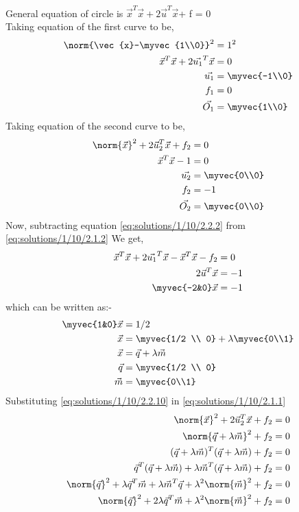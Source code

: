 
General equation of circle is ${\vec{x}^T\vec{x}} + 2\vec{u}^T\vec{x} $+ f = 0\\
Taking equation of the first curve to be,
\begin{align}
\norm{\vec{x}-\myvec{1\\0}}^2&=1^2\\
{\vec{x}^{T}\vec{x}+2\vec{u_1}^T\vec{x}}&=0 \label{eq:solutions/1/10/2.2.2}\\
\vec{u_1}&=\myvec{-1\\0}\\
f_1&=0\\
\vec{O_1}&=\myvec{1\\0}
\end{align}
Taking equation of the second curve to be,
\begin{align}
\norm{\vec{x}}^2 + 2\vec{u}_2^T\vec{x} + f_2&= 0\label{eq:solutions/1/10/2.1.1}\\
{\vec{x}^{T}\vec{x}}-1&=0 \label{eq:solutions/1/10/2.1.2}\\
\vec{u_2}&=\myvec{0\\0}\\
f_2&=-1\\
\vec{O_2}&=\myvec{0\\0}
\end{align}
Now, subtracting equation \eqref{eq:solutions/1/10/2.2.2} from \eqref{eq:solutions/1/10/2.1.2} We get,
\begin{align}
\vec{x}^T\vec{x}+2\vec{u_1}^T\vec{x}-\vec{x}^{T}\vec{x}-f_2&=0\\
2\vec{u}^{T}\vec{x}&=-1\\
\myvec{-2&0}\vec{x}&=-1
\end{align}
which can be written as:-
\begin{align}
\myvec{1&0}\vec{x}&=1/2 \\
\vec{x}&=\myvec{1/2 \\ 0} + \lambda \myvec{0\\1} \\
\vec{x}&=\vec{q}+\lambda\vec{m}\label{eq:solutions/1/10/2.2.10} \\
\vec{q}&=\myvec{1/2 \\ 0} \\
\vec{m}&=\myvec{0\\1}
\end{align}
Substituting \eqref{eq:solutions/1/10/2.2.10} in \eqref{eq:solutions/1/10/2.1.1}
\begin{align}
\norm{\vec{x}}^2 + 2\vec{u}_2^T\vec{x} + f_2&= 0 \\
\norm{\vec{q}+\lambda\vec{m}}^2 + f_2&= 0 \\
(\vec{q}+\lambda \vec{m})^T(\vec{q}+\lambda \vec{m})+f_2&= 0 \\
\vec{q}^T(\vec{q}+\lambda \vec{m})+\lambda  \vec{m}^T(\vec{q}+\lambda \vec{m})+f_2&= 0 \\ \norm{\vec{q}}^2+\lambda\vec{q}^T\vec{m}+\lambda\vec{m}^T\vec{q}+\lambda^2\norm{\vec{m}}^2+f_2&= 0 \\
\norm{\vec{q}}^2+2\lambda\vec{q}^T\vec{m}+\lambda^2\norm{\vec{m}}^2+f_2&= 0 
\end{align}
